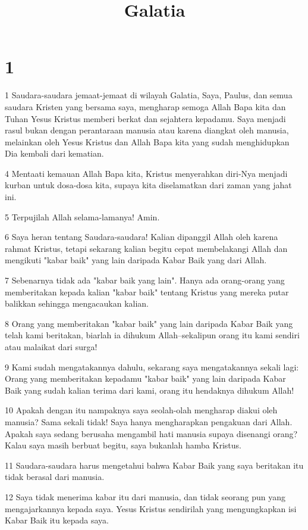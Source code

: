 

\title{Galatia}


\chapter{1}

\par 1 Saudara-saudara jemaat-jemaat di wilayah Galatia, Saya, Paulus, dan semua saudara Kristen yang bersama saya, mengharap semoga Allah Bapa kita dan Tuhan Yesus Kristus memberi berkat dan sejahtera kepadamu. Saya menjadi rasul bukan dengan perantaraan manusia atau karena diangkat oleh manusia, melainkan oleh Yesus Kristus dan Allah Bapa kita yang sudah menghidupkan Dia kembali dari kematian.
\par 4 Mentaati kemauan Allah Bapa kita, Kristus menyerahkan diri-Nya menjadi kurban untuk dosa-dosa kita, supaya kita diselamatkan dari zaman yang jahat ini.
\par 5 Terpujilah Allah selama-lamanya! Amin.
\par 6 Saya heran tentang Saudara-saudara! Kalian dipanggil Allah oleh karena rahmat Kristus, tetapi sekarang kalian begitu cepat membelakangi Allah dan mengikuti "kabar baik" yang lain daripada Kabar Baik yang dari Allah.
\par 7 Sebenarnya tidak ada "kabar baik yang lain". Hanya ada orang-orang yang memberitakan kepada kalian "kabar baik" tentang Kristus yang mereka putar balikkan sehingga mengacaukan kalian.
\par 8 Orang yang memberitakan "kabar baik" yang lain daripada Kabar Baik yang telah kami beritakan, biarlah ia dihukum Allah--sekalipun orang itu kami sendiri atau malaikat dari surga!
\par 9 Kami sudah mengatakannya dahulu, sekarang saya mengatakannya sekali lagi: Orang yang memberitakan kepadamu "kabar baik" yang lain daripada Kabar Baik yang sudah kalian terima dari kami, orang itu hendaknya dihukum Allah!
\par 10 Apakah dengan itu nampaknya saya seolah-olah mengharap diakui oleh manusia? Sama sekali tidak! Saya hanya mengharapkan pengakuan dari Allah. Apakah saya sedang berusaha mengambil hati manusia supaya disenangi orang? Kalau saya masih berbuat begitu, saya bukanlah hamba Kristus.
\par 11 Saudara-saudara harus mengetahui bahwa Kabar Baik yang saya beritakan itu tidak berasal dari manusia.
\par 12 Saya tidak menerima kabar itu dari manusia, dan tidak seorang pun yang mengajarkannya kepada saya. Yesus Kristus sendirilah yang mengungkapkan isi Kabar Baik itu kepada saya.
